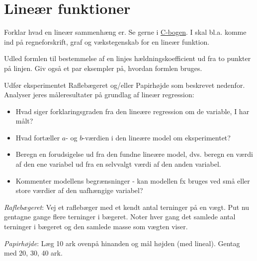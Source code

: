 \documentclass[10pt,a4paper,table]{article}
\begin{document}
\thispagestyle{plain}

\vspace{1em}


\section{Lineær funktioner}
\vspace{-0.7em}
Forklar hvad en lineær sammenhæng er. Se gerne i \href{https://plusstxa1.systime.dk/?id=1227}{C-bogen}. I skal bl.a. komme ind på regneforskrift, graf og vækstegenskab for en lineær funktion.

Udled formlen til bestemmelse af en linjes hældningskoefficient ud fra to punkter på linjen. Giv også et par eksempler på, hvordan formlen bruges.

Udfør eksperimentet Raflebægeret og/eller Papirhøjde som beskrevet nedenfor. Analyser jeres måleresultater på grundlag af lineær regression: 
\begin{itemize}
  \item Hvad siger forklaringsgraden fra den lineære regression om de variable, I har målt?
  \item Hvad fortæller $a$- og $b$-værdien i den lineære model om eksperimentet?
  \item Beregn en forudsigelse ud fra den fundne lineære model, dvs. beregn en værdi af den ene variabel ud fra en selvvalgt værdi af den anden variabel.
  \item Kommenter modellens begrænsninger - kan modellen fx bruges ved små eller store værdier af den uafhængige variabel?
\end{itemize}

\emph{Raflebægeret}:
Vej et raflebæger med et kendt antal terninger på en vægt. Put nu gentagne gange flere terninger i bægeret. Noter hver gang det samlede antal terninger i bægeret og den samlede masse som vægten viser.

\emph{Papirhøjde}:
Læg 10 ark ovenpå hinanden og mål højden (med lineal). Gentag med 20, 30, 40 ark.
\end{document}
